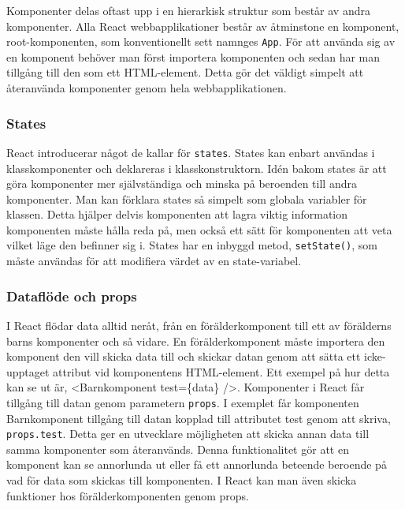 Komponenter delas oftast upp i en hierarkisk struktur som består av andra komponenter. Alla React webbapplikationer består av åtminstone en komponent, root-komponenten, som konventionellt sett namnges \texttt{App}. För att använda sig av en komponent behöver man först importera komponenten och sedan har man tillgång till den som ett HTML-element. Detta gör det väldigt simpelt att återanvända komponenter genom hela webbapplikationen.



\subsubsection{States} 
React introducerar något de kallar för \texttt{states}.\cite{react-states} States kan enbart användas i klasskomponenter och deklareras i klasskonstruktorn. Idén bakom states är att göra komponenter mer självständiga och minska på beroenden till andra komponenter. Man kan förklara states så simpelt som globala variabler för klassen. Detta hjälper delvis komponenten att lagra viktig information komponenten måste hålla reda på, men också ett sätt för komponenten att veta vilket läge den befinner sig i. States har en inbyggd metod, \texttt{setState()}, som måste användas för att modifiera värdet av en state-variabel. 

\subsubsection{Dataflöde och props}
I React flödar data alltid neråt\cite{react-states}, från en förälderkomponent till ett av förälderns barns komponenter och så vidare. En förälderkomponent måste importera den komponent den vill skicka data till och skickar datan genom att sätta ett icke-upptaget attribut vid komponentens HTML-element. Ett exempel på hur detta kan se ut är, <Barnkomponent test=\{data\} />. Komponenter i React får tillgång till datan genom parametern \texttt{props}. I exemplet får komponenten Barnkomponent tillgång till datan kopplad till attributet test genom att skriva, \texttt{props.test}. Detta ger en utvecklare möjligheten att skicka annan data till samma komponenter som återanvänds. Denna funktionalitet gör att en komponent kan se annorlunda ut eller få ett annorlunda beteende beroende på vad för data som skickas till komponenten. I React kan man även skicka funktioner hos förälderkomponenten genom props. 
